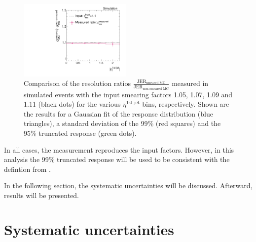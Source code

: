 \begin{figure}[tbp]
  \centering

    \includegraphics[width=0.49\textwidth]{figures/resolution/methodology/MCClosureRatio.pdf}

  \caption{Comparison of the resolution ratios $\frac{\text{JER}_{\text{smeared MC}}}{\text{JER}_{\text{non-smeared MC}}}$ 
           measured in simulated events with the input smearing factors 1.05, 1.07, 1.09 and 1.11 (black dots) for the various $\eta^{\text{1st jet}}$ bins, respectively. 
           Shown are the results for a Gaussian fit of the response 
           distribution (blue triangles), a standard deviation of the 99\% (red squares) and the 95\% truncated response (green dots).}
  \label{fig:MCClosureRatio}
\end{figure}

In all cases, the measurement reproduces the input factors.
However, in this analysis the 99\% truncated response will be used to be consistent with the defintion from \cite{CMS-AN-2010-076}.

In the following section, the systematic uncertainties will be discussed. Afterward, results will be presented.



\chapter{Systematic uncertainties}

